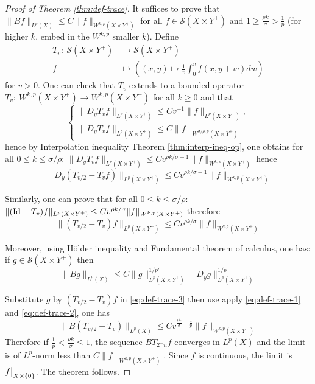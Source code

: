 \begin{proof}[Proof of Theorem \ref{thm:def-trace}]
It suffices to prove that \(\|Bf\|_{L^p(X)} \leq C\|f\|_{W^{k,p}(X\times Y^+)}\) for all
\(f\in \mathcal{S}(X\times Y^+)\) and \(1 \geq \frac{\rho k}{\sigma} > \frac{1}{p}\)
(for higher \(k\), embed in the \(W^{k,p}\) smaller \(k\)). Define
\begin{align*}
  T_v:\ \mathcal{S}(X\times Y^+) &\longrightarrow \mathcal{S}(X\times Y^+)\\
  	f		    	 &\longmapsto  \left((x,y) \longmapsto \frac{1}{v}\int_0^v f(x,y+w)dw\right)
\end{align*}
for \(v>0\). One can check that \(T_v\) extends to a bounded operator \(T_v:\
W^{k,p}(X\times Y^+) \longrightarrow W^{k,p}(X\times Y^+)\) for all \(k\geq 0\) and
that
\begin{equation*}
\begin{cases}
\|D_y T_v f\|_{L^p(X\times Y^+)} \leq Cv^{-1} \|f\|_{L^p(X\times Y^+)},  \\
\|D_y T_v f\|_{L^p(X\times Y^+)} \leq C\|f\|_{W^{\sigma/\rho,p}(X\times Y^+)}
\end{cases}
\end{equation*}
hence by Interpolation inequality Theorem \ref{thm:interp-ineq-op}, one obtains for all \(0\leq
k\leq \sigma/\rho\): \(\|D_y T_v f\|_{L^p(X\times Y^+)} \leq C v^{\rho k/\sigma -
1}\|f\|_{W^{k,p}(X\times Y^+)}\) hence
\begin{equation}
\label{eq:def-trace-1}
\|D_y (T_{v/2}- T_v f)\|_{L^p(X\times Y^+)} \leq C v^{\rho k/\sigma - 1}\|f\|_{W^{k,p}(X\times Y^+)}
\end{equation}

Similarly, one can prove that for all \(0\leq
k\leq \sigma/\rho\): \(\|({\rm Id} -  T_v) f\|_{L^p(X\times Y^+)} \leq C v^{\rho
k/\sigma}\|f\|_{W^{k,p}(X\times Y^+)}\) therefore
\begin{equation}
\label{eq:def-trace-2}
\|(T_{v/2} -  T_v) f\|_{L^p(X\times Y^+)} \leq C v^{\rho k/\sigma}\|f\|_{W^{k,p}(X\times Y^+)}
\end{equation}

Moreover, using Hölder inequality and Fundamental theorem of calculus, one has: if \(g\in
\mathcal{S}(X\times Y^+)\) then
\begin{equation}
\label{eq:def-trace-3}
\|B g\|_{L^p(X)}\leq C\|g\|^{1/p'}_{L^p(X\times Y^+)}\|D_y g\|^{1/p}_{L^p(X\times Y^+)}
\end{equation}

Substitute \(g\) by \((T_{v/2}- T_v)f\) in \eqref{eq:def-trace-3} then use apply
\eqref{eq:def-trace-1} and \eqref{eq:def-trace-2}, one has
\[
 \|B(T_{v/2}-T_v)\|_{L^p(X)}\leq C v^{\frac{\rho k}{\sigma} -
\frac{1}{p}}\|f\|_{W^{k,p}(X\times Y^+)}
\]
Therefore if \(\frac{1}{p} < \frac{\rho k}{\sigma}\leq 1\), the sequence \(B T_{2^-n}f\) converges in \(L^p(X)\) and the limit is of \(L^p\)-norm less than \(C\|f\|_{W^{k,p}(X\times Y^+)}\). Since \(f\) is continuous, the limit is \(\restr{f}{X\times \{0\}}\). The theorem follows.
\end{proof}

